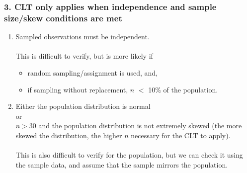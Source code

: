 \documentclass[11pt,containsverbatim,handout,xcolor=xelatex,dvipsnames,table]{beamer}
\begin{document}

\begin{frame}
\frametitle{3. CLT only applies when independence and sample size/skew conditions are met}

\begin{enumerate}

\item {} Sampled observations must be independent. \\

$\:$ \\
This is difficult to verify, but is more likely if
\begin{itemize}
\item random sampling/assignment is used, and,
\item if sampling without replacement, $n$ $<$ 10\% of the population.
\end{itemize}

\pause

\item {} Either the population distribution is normal \\
or\\
$n > 30$ and the population distribution is not extremely skewed (the more skewed the distribution, the higher $n$ necessary for the CLT to apply).\\
$\:$ \\
This is also difficult to verify for the population, but we can check it using the sample data, and assume that the sample mirrors the population.






\end{enumerate}


\end{frame}
\end{document}
